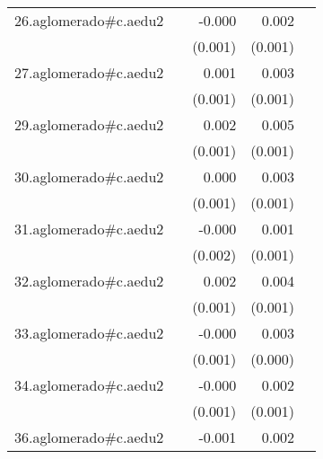 {\begin{longtable}{l*{4}{D{.}{.}{-1}}}
\addlinespace
26.aglomerado#c.aedu2&                     &      -0.000         &       0.002\sym{**} &                     \\
            &                     &     (0.001)         &     (0.001)         &                     \\
\addlinespace
27.aglomerado#c.aedu2&                     &       0.001         &       0.003\sym{**} &                     \\
            &                     &     (0.001)         &     (0.001)         &                     \\
\addlinespace
29.aglomerado#c.aedu2&                     &       0.002         &       0.005\sym{***}&                     \\
            &                     &     (0.001)         &     (0.001)         &                     \\
\addlinespace
30.aglomerado#c.aedu2&                     &       0.000         &       0.003\sym{**} &                     \\
            &                     &     (0.001)         &     (0.001)         &                     \\
\addlinespace
31.aglomerado#c.aedu2&                     &      -0.000         &       0.001         &                     \\
            &                     &     (0.002)         &     (0.001)         &                     \\
\addlinespace
32.aglomerado#c.aedu2&                     &       0.002         &       0.004\sym{***}&                     \\
            &                     &     (0.001)         &     (0.001)         &                     \\
\addlinespace
33.aglomerado#c.aedu2&                     &      -0.000         &       0.003\sym{***}&                     \\
            &                     &     (0.001)         &     (0.000)         &                     \\
\addlinespace
34.aglomerado#c.aedu2&                     &      -0.000         &       0.002\sym{*}  &                     \\
            &                     &     (0.001)         &     (0.001)         &                     \\
\addlinespace
36.aglomerado#c.aedu2&                     &      -0.001         &       0.002\sym{*}  &                     \\

\end{longtable}}
